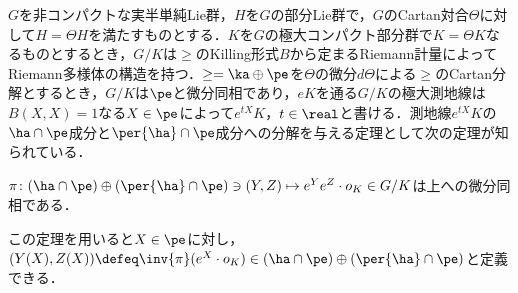 $G$を非コンパクトな実半単純Lie群，$H$を$G$の部分Lie群で，$G$のCartan対合$\Theta$に対して$H = \Theta H$を満たすものとする．$K$を$G$の極大コンパクト部分群で$K = \Theta K $なるものとするとき，$G/K$は$\ge$のKilling形式$B$から定まるRiemann計量によってRiemann多様体の構造を持つ．$\ge = \ka \oplus \pe $を$\Theta$の微分$d\Theta$による$\ge$のCartan分解とするとき，$G/K$は$\pe$と微分同相であり，$eK$を通る$G/K$の極大測地線は$B(X, X) = 1 $なる$X\in \pe$によって$e^{tX}K $，$t\in \real$と書ける．測地線$e^{tX}K$の$\ha\cap\pe$成分と$\per{\ha}\cap\pe$成分への分解を与える定理として次の定理が知られている．

\begin{thm*}\cite[Lemma~6.1]{kob89}\label{thm:kob89-lem6.1}

  $\pi\colon  (\ha\cap\pe)\oplus (\per{\ha}\cap \pe) \ni (Y, Z)\mapsto e^{Y}e^{Z}\cdot o_K \in G/K $は上への微分同相である．
\end{thm*}
この定理を用いると$X\in \pe$に対し，$(Y(X), Z(X))\defeq \inv{\pi}(e^X\cdot o_K)\in (\ha\cap\pe)\oplus (\per{\ha}\cap \pe)$と定義できる．

